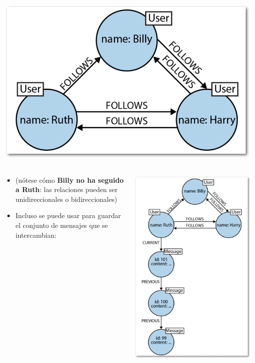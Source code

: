 \documentclass[14pt]{beamer}
\begin{document}
\begin{frame}
\begin{itemize}
\begin{frame}[allowframebreaks]
\begin{itemize}
    \begin{center}
      \includegraphics[width=.4\textwidth]{img/graph1}
    \end{center}
  \end{itemize}

    \begin{columns}
      \begin{column}{.5\textwidth}
        \begin{itemize}
      \item (nótese cómo {\bf Billy no ha seguido a Ruth}: las relaciones
        pueden ser unidireccionales o bidireccionales)

      \item Incluso se puede usar para guardar el conjunto de mensajes
        que se intercambian:
      \end{itemize}
    \end{column}
      \begin{column}{.5\textwidth}
        \begin{center}
          \includegraphics[width=.8\textwidth]{img/graph2}
        \end{center}
      \end{column}
    \end{columns}


\end{frame}
\end{itemize}
\end{frame}
\end{document}
